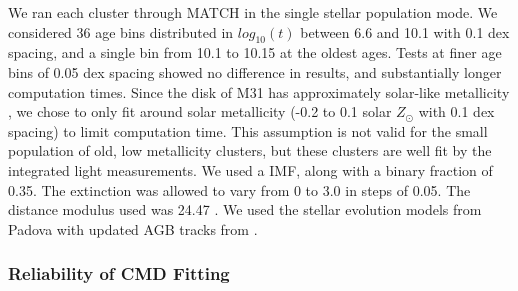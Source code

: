 \documentclass{emulateapj}
\begin{document}
We ran each cluster through MATCH in the single stellar population mode.  We considered 36 age bins distributed in $log_{10} (t)$ between 6.6 and 10.1 with 0.1 dex spacing, and a single bin from 10.1 to 10.15 at the oldest ages.  Tests at finer age bins of 0.05 dex spacing showed no difference in results, and substantially longer computation times.  Since the disk of M31 has approximately solar-like metallicity \citep[e.g.,][] {Sanders12, Zurita12}, we chose to only fit around solar metallicity (-0.2 to 0.1 solar $Z_{\odot}$ with 0.1 dex spacing) to limit computation time.  This assumption is not valid for the small population of old, low metallicity clusters, but these clusters are well fit by the integrated light measurements.  We used a \citet{Kroupa01} IMF, along with a binary fraction of 0.35.  The extinction was allowed to vary from 0 to 3.0 in steps of 0.05.  The distance modulus used was 24.47 \citep{McConnachie05}.  We used the stellar evolution models from Padova \citep{Marigo08} with updated AGB tracks from \cite{Girardi10}.








\subsubsection{Reliability of CMD Fitting} \label{sec:synthetic}
\end{document}

